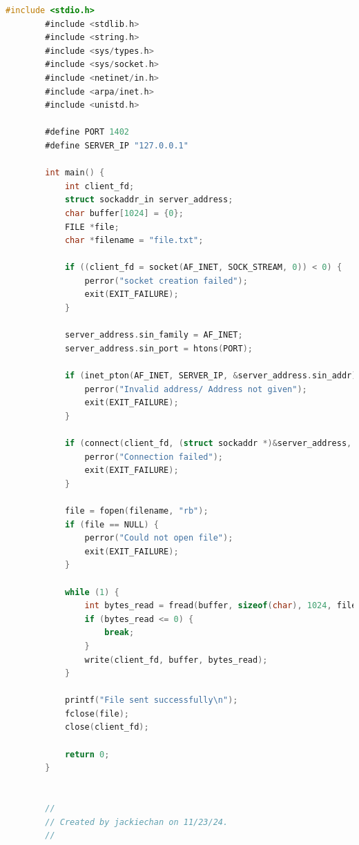\documentclass{article}
\begin{document}
	\begin{lstlisting}[language=C, caption=Client file in C]
		#include <stdio.h>
		#include <stdlib.h>
		#include <string.h>
		#include <sys/types.h>
		#include <sys/socket.h>
		#include <netinet/in.h>
		#include <arpa/inet.h>
		#include <unistd.h>
		
		#define PORT 1402
		#define SERVER_IP "127.0.0.1"
		
		int main() {
			int client_fd;
			struct sockaddr_in server_address;
			char buffer[1024] = {0};
			FILE *file;
			char *filename = "file.txt";
			
			if ((client_fd = socket(AF_INET, SOCK_STREAM, 0)) < 0) {
				perror("socket creation failed");
				exit(EXIT_FAILURE);
			}
			
			server_address.sin_family = AF_INET;
			server_address.sin_port = htons(PORT);
			
			if (inet_pton(AF_INET, SERVER_IP, &server_address.sin_addr) <= 0) {
				perror("Invalid address/ Address not given");
				exit(EXIT_FAILURE);
			}
			
			if (connect(client_fd, (struct sockaddr *)&server_address, sizeof(server_address)) < 0) {
				perror("Connection failed");
				exit(EXIT_FAILURE);
			}
			
			file = fopen(filename, "rb");
			if (file == NULL) {
				perror("Could not open file");
				exit(EXIT_FAILURE);
			}
			
			while (1) {
				int bytes_read = fread(buffer, sizeof(char), 1024, file);
				if (bytes_read <= 0) {
					break;
				}
				write(client_fd, buffer, bytes_read);
			}
			
			printf("File sent successfully\n");
			fclose(file);
			close(client_fd);
			
			return 0;
		}
		
		
		//
		// Created by jackiechan on 11/23/24.
		//
		
		
			\end{lstlisting}
	
\end{document}
